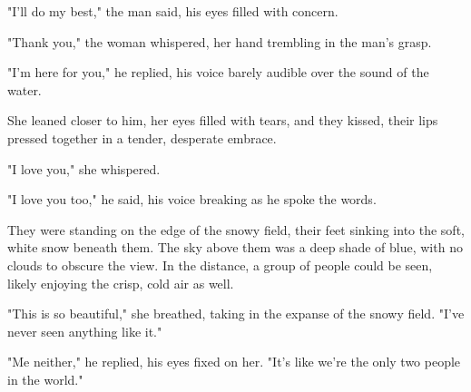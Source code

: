 \documentclass[smalldemyvopaper,11pt,twoside,onecolumn,openright,extrafontsizes]{memoir}
\begin{document}
"I'll do my best," the man said, his eyes filled with concern.\par
"Thank you," the woman whispered, her hand trembling in the man's grasp.\par
"I'm here for you," he replied, his voice barely audible over the sound of the water.\par
She leaned closer to him, her eyes filled with tears, and they kissed, their lips pressed together in a tender, desperate embrace.\par
"I love you," she whispered.\par
"I love you too," he said, his voice breaking as he spoke the words.\par
They were standing on the edge of the snowy field, their feet sinking into the soft, white snow beneath them. The sky above them was a deep shade of blue, with no clouds to obscure the view. In the distance, a group of people could be seen, likely enjoying the crisp, cold air as well.\par
"This is so beautiful," she breathed, taking in the expanse of the snowy field. "I've never seen anything like it."\par
"Me neither," he replied, his eyes fixed on her. "It's like we're the only two people in the world."\par
\end{document}
